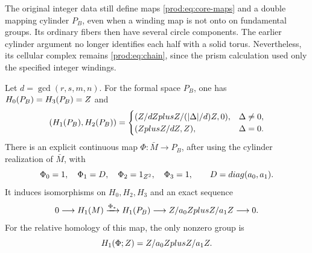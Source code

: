 The original integer data still define maps \eqref{prod:eq:core-maps} and
a double mapping cylinder $P_B$, even when a winding map is not onto
on fundamental groups.  Its ordinary fibers then have several circle
components.  The earlier cylinder argument no longer identifies each
half with a solid torus.  Nevertheless, its cellular complex remains
\eqref{prod:eq:chain}, since the prism calculation used only the specified
integer windings.

\begin{theorem}\label{prod:thm:nonfree}
Let $d=\gcd(r,s,m,n)$.
For the formal space $P_B$, one has $H_0(P_B)=H_3(P_B)=Z$ and
\[
 (H_1(P_B),H_2(P_B))=
 \begin{cases}
 (Z/dZplusZ/(|\Delta|/d)Z,0),&\Delta\ne0,\\
 (ZplusZ/dZ,Z),&\Delta=0.
 \end{cases}
\]
There is an explicit continuous map $\Phi:\bar M\to P_B$, after
using the cylinder realization of $\bar M$, with
\begin{equation}\label{prod:eq:comparison}
 \Phi_0=1,\quad \Phi_1=D,\quad\Phi_2=1_{Z^2},\quad\Phi_3=1,
 \qquad D=diag(a_0,a_1).
\end{equation}
It induces isomorphisms on $H_0,H_2,H_3$ and an exact sequence
\begin{equation}\label{prod:eq:nonfree-h1}
 0\longrightarrow H_1(M)\xrightarrow{\Phi_*}H_1(P_B)
 \longrightarrow Z/a_0ZplusZ/a_1Z\longrightarrow0.
\end{equation}
For the relative homology of this map, the only nonzero group is
\[
                 H_1(\Phi;Z)=Z/a_0ZplusZ/a_1Z.
\]
\end{theorem}

